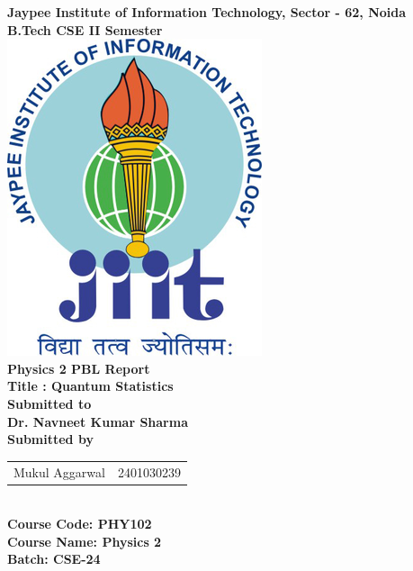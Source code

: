 \documentclass[12pt,a4paper]{article}
\begin{document}
\begin{titlepage}
    \centering
    \Huge
    \textbf{Jaypee Institute of Information Technology, Sector - 62, Noida} \\
    \vspace{0.5cm}
    \Large
    \textbf{B.Tech CSE II Semester} \\
    \vspace{1cm}
    \vspace*{\fill}
    \includegraphics[scale=2]{jiit_logo} \\
    \vspace{1.5cm}
    \Huge
    \textbf{Physics 2 PBL Report} \\
    \Large
    \textbf{Title : Quantum Statistics} \\
    \vspace{1cm}
    \Large
    \textbf{Submitted to} \\
    \textbf{Dr. Navneet Kumar Sharma}\\
    \vspace{1cm}
    \textbf{Submitted by} \\
    \vspace{0.5cm}
    \begin{tabular}{ll}
        Mukul Aggarwal & 2401030239 \\
    \end{tabular} \\
    \vspace{0.5cm}
    \textbf{Course Code: PHY102} \\
    \textbf{Course Name: Physics 2} \\
    \textbf{Batch: CSE-24} \\
    \vspace*{\fill}
    \normalsize
\end{titlepage}
\end{document}
